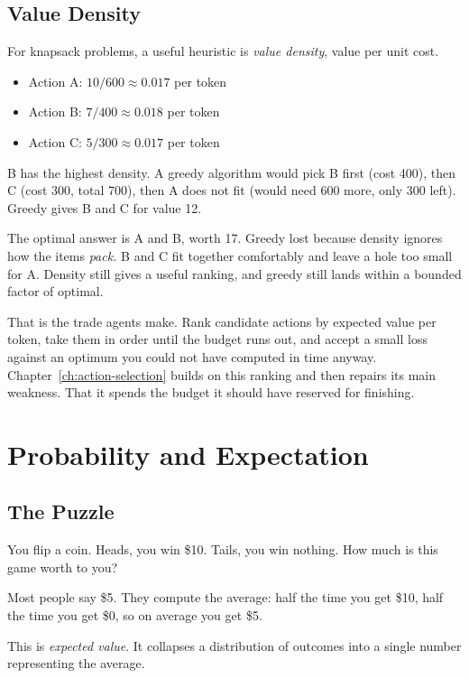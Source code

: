 \subsection{Value Density}

For knapsack problems, a useful heuristic is \textit{value density}, value per unit cost.
\begin{itemize}
\item Action A: $10/600 \approx 0.017$ per token
\item Action B: $7/400 \approx 0.018$ per token
\item Action C: $5/300 \approx 0.017$ per token
\end{itemize}

B has the highest density. A greedy algorithm would pick B first (cost 400), then C (cost 300, total 700), then A does not fit (would need 600 more, only 300 left). Greedy gives B and C for value 12.

The optimal answer is A and B, worth 17. Greedy lost because density ignores how the items \emph{pack.} B and C fit together comfortably and leave a hole too small for A. Density still gives a useful ranking, and greedy still lands within a bounded factor of optimal.

That is the trade agents make. Rank candidate actions by expected value per token, take them in order until the budget runs out, and accept a small loss against an optimum you could not have computed in time anyway. Chapter~\ref{ch:action-selection} builds on this ranking and then repairs its main weakness. That it spends the budget it should have reserved for finishing.

\section{Probability and Expectation}

\subsection{The Puzzle}

You flip a coin. Heads, you win \$10. Tails, you win nothing. How much is this game worth to you?

Most people say \$5. They compute the average: half the time you get \$10, half the time you get \$0, so on average you get \$5.

This is \textit{expected value}. It collapses a distribution of outcomes into a single number representing the average.

